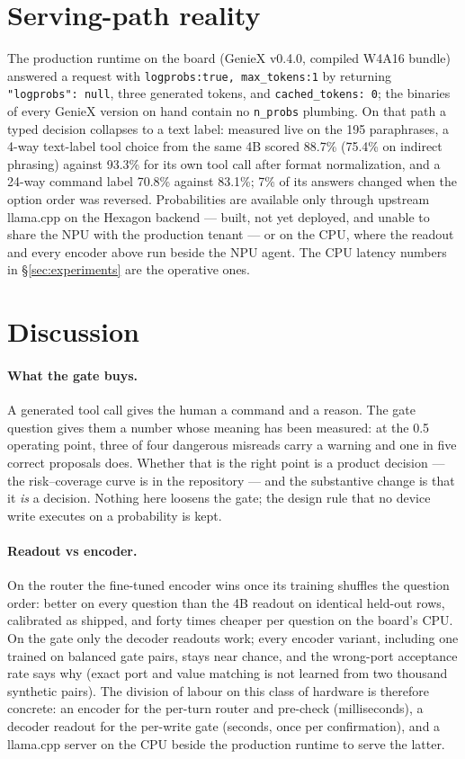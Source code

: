 \documentclass[11pt]{article}
\begin{document}
\section{Serving-path reality}
\label{sec:serving}

The production runtime on the board (GenieX v0.4.0, compiled W4A16 bundle) answered a request
with \texttt{logprobs:true, max\_tokens:1} by returning \texttt{"logprobs": null}, three
generated tokens, and \texttt{cached\_tokens: 0}; the binaries of every GenieX version on hand
contain no \texttt{n\_probs} plumbing. On that path a typed decision collapses to a text label:
measured live on the 195 paraphrases, a 4-way text-label tool choice from the same 4B scored
88.7\% (75.4\% on indirect phrasing) against 93.3\% for its own tool call after format
normalization, and a 24-way command label 70.8\% against 83.1\%; 7\% of its answers changed
when the option order was reversed. Probabilities are available only through upstream
llama.cpp on the Hexagon backend --- built, not yet deployed, and unable to share the NPU with
the production tenant --- or on the CPU, where the readout and every encoder above run beside
the NPU agent. The CPU latency numbers in \S\ref{sec:experiments} are the operative ones.

\section{Discussion}

\paragraph{What the gate buys.} A generated tool call gives the human a command and a reason.
The gate question gives them a number whose meaning has been measured: at the 0.5 operating
point, three of four dangerous misreads carry a warning and one in five correct proposals does.
Whether that is the right point is a product decision --- the risk--coverage curve is in the
repository --- and the substantive change is that it \emph{is} a decision. Nothing here loosens
the gate; the design rule that no device write executes on a probability is kept.

\paragraph{Readout vs encoder.} On the router the fine-tuned encoder wins once its training
shuffles the question order: better on every question than the 4B readout on identical held-out
rows, calibrated as shipped, and forty times cheaper per question on the board's CPU. On the
gate only the decoder readouts work; every encoder variant, including one trained on balanced
gate pairs, stays near chance, and the wrong-port acceptance rate says why (exact port and value
matching is not learned from two thousand synthetic pairs). The division of labour on this class
of hardware is therefore concrete: an encoder for the per-turn router and pre-check
(milliseconds), a decoder readout for the per-write gate (seconds, once per confirmation), and
a llama.cpp server on the CPU beside the production runtime to serve the latter.
\end{document}
